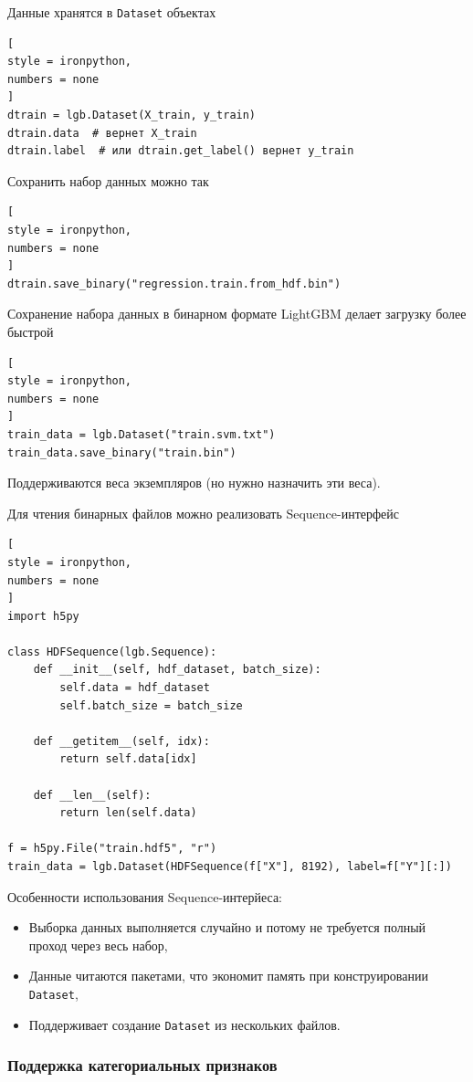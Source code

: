\documentclass[%
	11pt,
	a4paper,
	utf8,
		]{article}
\begin{document}
Данные хранятся в \verb|Dataset| объектах
\begin{lstlisting}[
style = ironpython,
numbers = none
]
dtrain = lgb.Dataset(X_train, y_train)
dtrain.data  # вернет X_train
dtrain.label  # или dtrain.get_label() вернет y_train
\end{lstlisting}

Сохранить набор данных можно так
\begin{lstlisting}[
style = ironpython,
numbers = none
]
dtrain.save_binary("regression.train.from_hdf.bin")
\end{lstlisting}

Сохранение набора данных в бинарном формате LightGBM делает загрузку более быстрой
\begin{lstlisting}[
style = ironpython,
numbers = none
]
train_data = lgb.Dataset("train.svm.txt")
train_data.save_binary("train.bin")
\end{lstlisting}

Поддерживаются веса экземпляров (но нужно назначить эти веса). 

Для чтения бинарных файлов можно реализовать Sequence-интерфейс
\begin{lstlisting}[
style = ironpython,
numbers = none
]
import h5py

class HDFSequence(lgb.Sequence):
    def __init__(self, hdf_dataset, batch_size):
        self.data = hdf_dataset
        self.batch_size = batch_size
        
    def __getitem__(self, idx):
        return self.data[idx]
        
    def __len__(self):
        return len(self.data)
        
f = h5py.File("train.hdf5", "r")
train_data = lgb.Dataset(HDFSequence(f["X"], 8192), label=f["Y"][:])
\end{lstlisting}

Особенности использования Sequence-интерйеса:
\begin{itemize}
	\item Выборка данных выполняется случайно и потому не требуется полный проход через весь набор,
	
	\item Данные читаются пакетами, что экономит память при конструировании \verb|Dataset|,
	
	\item Поддерживает создание \verb|Dataset| из нескольких файлов.
\end{itemize}

\subsubsection{Поддержка категориальных признаков}
\end{document}
